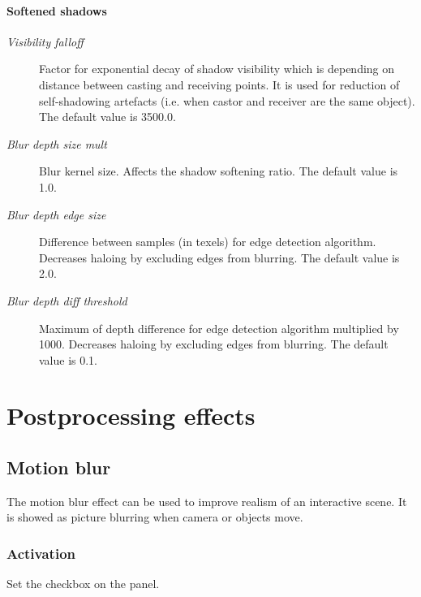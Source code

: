 \documentclass[a4paper,12pt,oneside]{sphinxmanual}
\begin{document}
\subsubsection{Softened shadows}
\label{lighting:id12}\begin{description}
\item[{\emph{Visibility falloff}}] \leavevmode
Factor for exponential decay of shadow visibility which is depending on distance between casting and receiving points. It is used for reduction of self-shadowing artefacts (i.e. when castor and receiver are the same object). The default value is 3500.0.

\item[{\emph{Blur depth size mult}}] \leavevmode
Blur kernel size. Affects the shadow softening ratio. The default value is 1.0.

\item[{\emph{Blur depth edge size}}] \leavevmode
Difference between samples (in texels) for edge detection algorithm. Decreases haloing by excluding edges from blurring. The default value is 2.0.

\item[{\emph{Blur depth diff threshold}}] \leavevmode
Maximum of depth difference for edge detection algorithm multiplied by 1000. Decreases haloing by excluding edges from blurring. The default value is 0.1.

\end{description}


\chapter{Postprocessing effects}
\label{postprocessing_effects:postprocessing-effects}\label{postprocessing_effects::doc}\label{postprocessing_effects:id1}

\section{Motion blur}
\label{postprocessing_effects:id2}\label{postprocessing_effects:motion-blur}\label{postprocessing_effects:index-0}
The motion blur effect can be used to improve realism of an interactive scene. It is showed as picture blurring when camera or objects move.


\subsection{Activation}
\label{postprocessing_effects:id3}
Set the  checkbox on the  panel.
\end{document}
